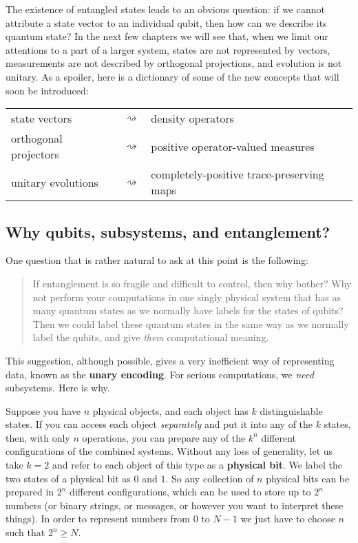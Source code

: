 \documentclass[fleqn]{article}
\begin{document}
The existence of entangled states leads to an obvious question: if we cannot attribute a state vector to an individual qubit, then how can we describe its quantum state?
In the next few chapters we will see that, when we limit our attentions to a part of a larger system, states are not represented by vectors, measurements are not described by orthogonal projections, and evolution is not unitary.
As a spoiler, here is a dictionary of some of the new concepts that will soon be introduced:

\begin{longtable}[]{@{}
  >{\raggedleft\arraybackslash}p{}
  >{\centering\arraybackslash}p{}
  >{\raggedright\arraybackslash}p{}@{}}
\toprule()
\endhead
state vectors & \(\rightsquigarrow\) & density operators \\
orthogonal projectors & \(\rightsquigarrow\) & positive operator-valued measures \\
unitary evolutions & \(\rightsquigarrow\) & completely-positive trace-preserving maps \\
\bottomrule()
\end{longtable}

\hypertarget{why-qubits-subsystems-and-entanglement}{%
\subsection{Why qubits, subsystems, and entanglement?}\label{why-qubits-subsystems-and-entanglement}}

One question that is rather natural to ask at this point is the following:

\begin{quote}
If entanglement is so fragile and difficult to control, then why bother?
Why not perform your computations in one singly physical system that has as many quantum states as we normally have labels for the states of qubits?
Then we could label these quantum states in the same way as we normally label the qubits, and give \emph{them} computational meaning.
\end{quote}

This suggestion, although possible, gives a very inefficient way of representing data, known as the \textbf{unary encoding}.
For serious computations, we \emph{need} subsystems.
Here is why.

Suppose you have \(n\) physical objects, and each object has \(k\) distinguishable states.
If you can access each object \emph{separately} and put it into any of the \(k\) states, then, with only \(n\) operations, you can prepare any of the \(k^{n}\) different configurations of the combined systems.
Without any loss of generality, let us take \(k=2\) and refer to each object of this type as a \textbf{physical bit}.
We label the two states of a physical bit as \(0\) and \(1\).
So any collection of \(n\) physical bits can be prepared in \(2^{n}\) different configurations, which can be used to store up to \(2^{n}\) numbers (or binary strings, or messages, or however you want to interpret these things).
In order to represent numbers from \(0\) to \(N-1\) we just have to choose \(n\) such that \(2^n\geqslant N\).
\end{document}
